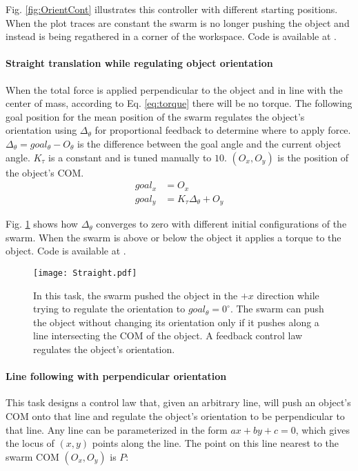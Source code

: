 Fig. \ref{fig:OrientCont} illustrates this controller with different starting positions. When the plot traces are constant the swarm is no longer pushing the object and instead is being regathered in a corner of the workspace. Code is available at \cite{Shahrokhi16Orient}.

\paragraph{Straight translation while regulating object orientation} \label{para:PureTranslation}

When the total force is applied perpendicular to the object and in line with the center of mass, according to Eq. \eqref{eq:torque} there will be no torque. 
The following goal position for the mean position of the swarm regulates the object's orientation using $\Delta_{\theta}$ for proportional feedback  to determine where to apply force.
$\Delta_\theta = goal_\theta - O_\theta$ is the difference between the goal angle and the current object angle.
 $K_\tau$ is a constant and is tuned manually to $10$. $(O_x,O_y)$ is the position of the object's COM.
\begin{align}
goal_x &= O_x \nonumber \\
goal_y &= K_\tau \Delta_{\theta} + O_y  \label{eq:TranslationAndOrientation}
\end{align}

 Fig. \ref{fig:Straight} shows how $\Delta_{\theta}$ converges to zero with different initial configurations of the swarm. When the swarm is above or below the object it applies a torque to the object. Code is available at \cite{Shahrokhi16translation}.
 
 
\begin{figure}
\begin{center}
	\texttt{[image: Straight.pdf]}
\end{center}
\vspace{-1em}
\caption{\label{fig:Straight}
In this task, the swarm pushed the object in the $+x$ direction while trying to regulate the orientation to $goal_{\theta} = 0^\circ$.
 The swarm can push the object without changing its orientation only if it pushes along a line intersecting the COM of the object.  A feedback control law regulates the object's orientation.
}
\vspace{-1em}
\end{figure}

\paragraph{Line following with perpendicular orientation} \label{para:PureTranslation}
This task designs a control law that, given an arbitrary line, will push an object's COM onto that line and regulate the object's orientation to be perpendicular to that line.
Any line can be parameterized in the form $ax+by+c =0$,  which gives the locus of $(x,y)$ points along the line.  The point on this line nearest to the swarm COM $(O_x,O_y)$ is $P$:

